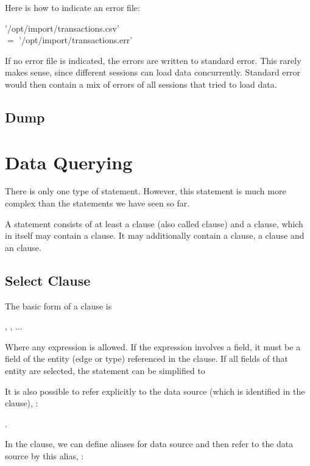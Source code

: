 Here is how to indicate an error file:

 '/opt/import/transactions.csv'
  \\
\hspace*{0.3cm} $=$ '/opt/import/transactions.err'

If no error file is indicated,
the errors are written to standard error.
This rarely makes sense,
since different sessions can load data concurrently.
Standard error would then contain a mix
of errors of all sessions that tried to load data.

\subsection{Dump}

\section{Data Querying}
There is only one type of  statement.
However, this statement is much more complex
than the statements we have seen so far.

A  statement consists of at least
a  clause (also called  clause)
and a  clause, which in itself may contain
a  clause.
It may additionally contain
a  clause,
a  clause and
an  clause.

\subsection{Select Clause}
The basic form of a  clause is

 , , $\dots$

Where any expression is allowed.
If the expression involves a field,
it must be a field of the entity (edge or type)
referenced in the  clause.
If all fields of that entity are selected,
the statement can be simplified to

 \keyword{$\ast$}

It is also possible to refer explicitly to the data source
(which is identified in the  clause), \eg:

 .

In the  clause, we can define aliases for data source
and then refer to the data source by this alias, \eg:

